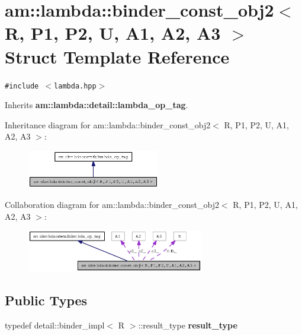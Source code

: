 \section{am::lambda::binder\_\-const\_\-obj2$<$ R, P1, P2, U, A1, A2, A3 $>$ Struct Template Reference}
\label{structam_1_1lambda_1_1binder__const__obj2}
{\tt \#include $<$lambda.hpp$>$}

Inherits {\bf am::lambda::detail::lambda\_\-op\_\-tag}.

Inheritance diagram for am::lambda::binder\_\-const\_\-obj2$<$ R, P1, P2, U, A1, A2, A3 $>$:\begin{figure}[H]
\begin{center}
\leavevmode
\includegraphics[width=164pt]{structam_1_1lambda_1_1binder__const__obj2__inherit__graph}
\end{center}
\end{figure}
Collaboration diagram for am::lambda::binder\_\-const\_\-obj2$<$ R, P1, P2, U, A1, A2, A3 $>$:\begin{figure}[H]
\begin{center}
\leavevmode
\includegraphics[width=219pt]{structam_1_1lambda_1_1binder__const__obj2__coll__graph}
\end{center}
\end{figure}
\subsection*{Public Types}
\begin{CompactItemize}
\item 
typedef detail::binder\_\-impl$<$ R $>$::result\_\-type \textbf{result\_\-type}\label{structam_1_1lambda_1_1binder__const__obj2_7115a7cf5632ba71ff68c294f4509c7b}

\end{CompactItemize}
